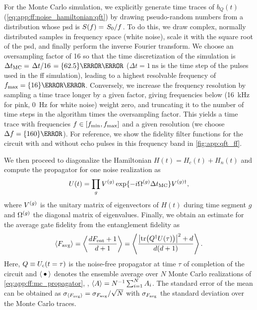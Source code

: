For the Monte Carlo simulation, we explicitly generate time traces of $b_Q(t)$ (\cf \cref{eq:app:ff:noise_hamiltonian:qft}) by drawing pseudo-random numbers from a distribution whose \gls{psd} is $S(f) = \flatfrac{S_0}{f}$.
To do this, we draw complex, normally distributed samples in frequency space (\ie white noise), scale it with the square root of the \gls{psd}, and finally perform the inverse Fourier transform.
We choose an oversampling factor of 16 so that the time discretization of the simulation is $\Delta t_\mr{MC} = \flatfrac{\Delta t}{16} = \qty{62.5}{\pico\second}$ ($\Delta t = \qty{1}{\nano\second}$ is the time step of the pulses used in the \gls{ff} simulation), leading to a highest resolvable frequency of $\fmax = \qty{16}{\giga\hertz}$.
Conversely, we increase the frequency resolution by sampling a time trace longer by a given factor, giving frequencies below \fmin (\qty{16}{\kilo\hertz} for pink, \qty{0}{\hertz} for white noise) weight zero, and truncating it to the number of time steps in the algorithm times the oversampling factor.
This yields a time trace with frequencies $f\in [f_{\mathrm{min}}, f_{\mathrm{max}}]$ and a given resolution (we choose $\df = \qty{160}{\hertz}$).
For reference, we show the fidelity filter functions for the circuit with and without echo pulses in this frequency band in \cref{fig:app:qft_ff}.

We then proceed to diagonalize the Hamiltonian $H(t) = H_c(t) + H_n(t)$ and compute the propagator for one noise realization as
\begin{equation}\label{eq:app:ff:mc_propagator}
U(t) = \prod_g V^{(g)}\exp\lbrace -i\Omega^{(g)}\Delta t_{\mathrm{MC}}\rbrace V^{(g)\dagger},
\end{equation}
where $V^{(g)}$ is the unitary matrix of eigenvectors of $H(t)$ during time segment $g$ and $\Omega^{(g)}$ the diagonal matrix of eigenvalues.
Finally, we obtain an estimate for the average gate fidelity \avgfid from the entanglement fidelity \entfid as
\begin{equation}
    \ev{\avgfid} = \ev{\frac{d\entfid + 1}{d+1}} = \ev{\frac{\abs{\tr(Q\adjoint U(\tau))}^2 + d}{d(d+1)}}.
\end{equation}
Here, $Q\equiv U_{\mathrm{c}}(t=\tau)$ is the noise-free propagator at time $\tau$ of completion of the circuit and $\ev{\placeholder}$ denotes the ensemble average over $N$ Monte Carlo realizations of \cref{eq:app:ff:mc_propagator}, \ie, $\ev{A}=N\inverse\sum_{i=1}^N A_i$.
The standard error of the mean can be obtained as $\sigma_{\ev{\avgfid}} = \sigma_{\avgfid} / \sqrt{N}$ with $\sigma_{F_{\mathrm{avg}}}$ the standard deviation over the Monte Carlo traces.

